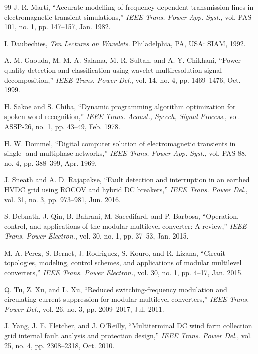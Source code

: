 \documentclass[journal]{IEEEtran}
\begin{document}
\begin{thebibliography}{99}
J. R. Marti, ``Accurate modelling of frequency-dependent transmission lines in electromagnetic transient simulations,'' \emph{IEEE Trans. Power App. Syst.}, vol. PAS-101, no. 1, pp. 147--157, Jan. 1982.

I. Daubechies, \emph{Ten Lectures on Wavelets}. Philadelphia, PA, USA: SIAM, 1992.

A. M. Gaouda, M. M. A. Salama, M. R. Sultan, and A. Y. Chikhani, ``Power quality detection and classification using wavelet-multiresolution signal decomposition,'' \emph{IEEE Trans. Power Del.}, vol. 14, no. 4, pp. 1469--1476, Oct. 1999.

H. Sakoe and S. Chiba, ``Dynamic programming algorithm optimization for spoken word recognition,'' \emph{IEEE Trans. Acoust., Speech, Signal Process.}, vol. ASSP-26, no. 1, pp. 43--49, Feb. 1978.

H. W. Dommel, ``Digital computer solution of electromagnetic transients in single- and multiphase networks,'' \emph{IEEE Trans. Power App. Syst.}, vol. PAS-88, no. 4, pp. 388--399, Apr. 1969.

J. Sneath and A. D. Rajapakse, ``Fault detection and interruption in an earthed HVDC grid using ROCOV and hybrid DC breakers,'' \emph{IEEE Trans. Power Del.}, vol. 31, no. 3, pp. 973--981, Jun. 2016.

S. Debnath, J. Qin, B. Bahrani, M. Saeedifard, and P. Barbosa, ``Operation, control, and applications of the modular multilevel converter: A review,'' \emph{IEEE Trans. Power Electron.}, vol. 30, no. 1, pp. 37--53, Jan. 2015.

M. A. Perez, S. Bernet, J. Rodriguez, S. Kouro, and R. Lizana, ``Circuit topologies, modeling, control schemes, and applications of modular multilevel converters,'' \emph{IEEE Trans. Power Electron.}, vol. 30, no. 1, pp. 4--17, Jan. 2015.

Q. Tu, Z. Xu, and L. Xu, ``Reduced switching-frequency modulation and circulating current suppression for modular multilevel converters,'' \emph{IEEE Trans. Power Del.}, vol. 26, no. 3, pp. 2009--2017, Jul. 2011.

J. Yang, J. E. Fletcher, and J. O'Reilly, ``Multiterminal DC wind farm collection grid internal fault analysis and protection design,'' \emph{IEEE Trans. Power Del.}, vol. 25, no. 4, pp. 2308--2318, Oct. 2010.


\end{thebibliography}
\end{document}
